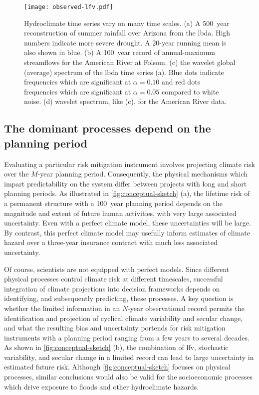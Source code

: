 \documentclass[
  draft,
  linenumbers
]{agujournal2018}
\begin{document}
\begin{figure}
  \centering
  \texttt{[image: observed-lfv.pdf]}
  \caption{
    Hydroclimate time series vary on many time scales.
    (a) A \SI{500}{year} reconstruction of summer rainfall over Arizona from the \acrfull{lbda}.
    High numbers indicate more severe drought.
    A 20-year running mean is also shown in blue.
    (b) A \SI{100}{year} record of annual-maximum streamflows for the American River at Folsom.
    (c) the wavelet global (average) spectrum of the \gls{lbda} time series (a).
    Blue dots indicate frequencies which are significant at $\alpha=0.10$ and red dots frequencies which are significant at $\alpha=0.05$ compared to white noise.
    (d) wavelet spectrum, like (c), for the American River data.
  }\label{fig:observed-lfv}
\end{figure}

\subsection{The dominant processes depend on the planning period}\label{sec:intro-dominant}

Evaluating a particular risk mitigation instrument involves projecting climate risk over the $M$-year planning period.
Consequently, the physical mechanisms which impart predictability on the system differ between projects with long and short planning periods.
As illustrated in \cref{fig:conceptual-sketch} (a), the lifetime risk of a permanent structure with a \SI{100}{year} planning period depends on the magnitude and extent of future human activities, with very large associated uncertainty.
Even with a perfect climate model, these uncertainties will be large.
By contrast, this perfect climate model may usefully inform estimates of climate hazard over a three-year insurance contract with much less associated uncertainty.

Of course, scientists are not equipped with perfect models.
Since different physical processes control climate risk at different timescales, successful integration of climate projections into decision frameworks depends on identifying, and subsequently predicting, these processes.
A key question is whether the limited information in an $N$-year observational record permits the identification and projection of cyclical climate variability and secular change, and what the resulting bias and uncertainty portends for risk mitigation instruments with a planning period ranging from a few years to several decades.
As shown in \cref{fig:conceptual-sketch} (b), the combination of \gls{lfv}, stochastic variability, and secular change in a limited record can lead to large uncertainty in estimated future risk.
Although \cref{fig:conceptual-sketch} focuses on physical processes, similar conclusions would also be valid for the socioeconomic processes which drive exposure to floods and other hydroclimate hazards.
\end{document}
